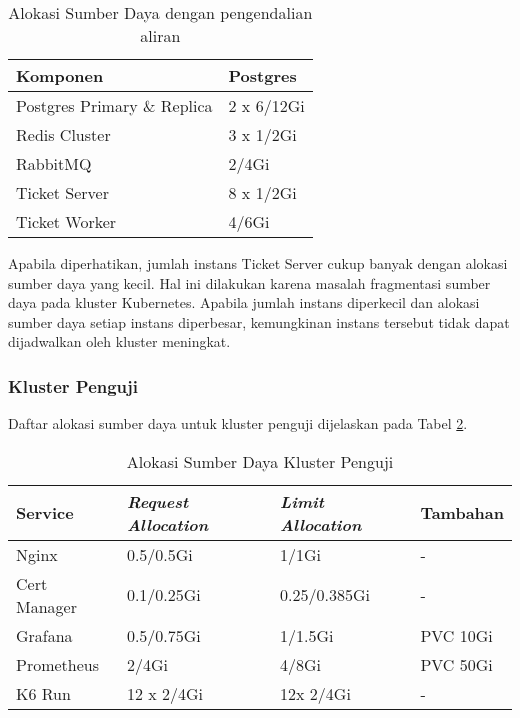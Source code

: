 \begin{table}[htbp]
    \centering
    \caption{Alokasi Sumber Daya dengan pengendalian aliran}
    \label{tab:service_comparison_fc}
    \begin{tabular}{|l|l|}
        \hline
        \textbf{Komponen}           & \textbf{Postgres} \\ \hline
        Postgres Primary \& Replica & 2 x 6/12Gi        \\ \hline
        Redis Cluster               & 3 x 1/2Gi         \\ \hline
        RabbitMQ                    & 2/4Gi             \\ \hline
        Ticket Server               & 8 x 1/2Gi         \\ \hline
        Ticket Worker               & 4/6Gi             \\ \hline
    \end{tabular}
\end{table}

Apabila diperhatikan, jumlah instans Ticket Server cukup banyak dengan alokasi sumber daya yang kecil. Hal ini dilakukan karena masalah fragmentasi sumber daya pada kluster Kubernetes. Apabila jumlah instans diperkecil dan alokasi sumber daya setiap instans diperbesar, kemungkinan instans tersebut tidak dapat dijadwalkan oleh kluster meningkat.

\subsubsection{Kluster Penguji}

Daftar alokasi sumber daya untuk kluster penguji dijelaskan pada Tabel \ref{tab:test-cluster-allocation}.

\begin{table}[htbp]
    \centering
    \caption{Alokasi Sumber Daya Kluster Penguji}
    \label{tab:test-cluster-allocation}
    \begin{tabular}{|l|l|l|l|}
        \hline
        \textbf{Service} & \textbf{\textit{Request Allocation}} & \textbf{\textit{Limit Allocation}} & \textbf{Tambahan} \\ \hline
        Nginx            & 0.5/0.5Gi                            & 1/1Gi                              & -                 \\ \hline
        Cert Manager     & 0.1/0.25Gi                           & 0.25/0.385Gi                       & -                 \\ \hline
        Grafana          & 0.5/0.75Gi                           & 1/1.5Gi                            & PVC 10Gi          \\ \hline
        Prometheus       & 2/4Gi                                & 4/8Gi                              & PVC 50Gi          \\ \hline
        K6 Run           & 12 x 2/4Gi                           & 12x 2/4Gi                          & -                 \\ \hline
    \end{tabular}
\end{table}

